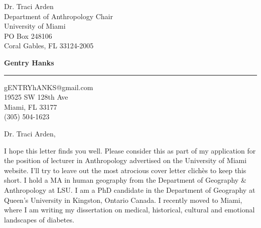 \documentclass[10pt]{letter} %
\begin{document}
\begin{letter}{Dr. Traci Arden \\
Department of Anthropology Chair \\
University of Miami \\
PO Box 248106 \\
Coral Gables, FL 33124-2005}


\begin{flushright}
\large\bf Gentry Hanks \\ %
\vspace{15pt} \hrule height 1pt %
gENTRYhANKS@gmail.com \\
19525 SW 128th Ave \\ 
Miami, FL 33177 \\ 
(305) 504-1623 \\%
\end{flushright} 

\signature{Gentry Hanks} %


\opening{Dr. Traci Arden,} 

I hope this letter finds you well. Please consider this as part of my application for the position of lecturer in Anthropology advertised on the University of Miami website. I'll try to leave out the most atrocious cover letter clich\`{e}s to keep this short. I hold a MA in human geography from the Department of Geography \& Anthropology at LSU. I am a PhD candidate in the Department of Geography at Queen's University in Kingston, Ontario Canada. I recently moved to Miami, where I am writing my dissertation on medical, historical, cultural and emotional landscapes of diabetes.


\end{letter}
\end{document}
